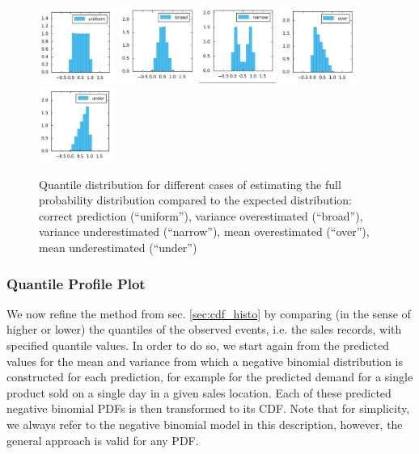 \documentclass[BCOR=1mm, DIV=calc,10pt,
twoside=true,
twocolumn,
headings=normal]{scrartcl}
\begin{document}
\begin{figure}
\begin{center}
\includegraphics[width=2.5cm]{../figures/CDFHistos_uniform}
\includegraphics[width=2.5cm]{../figures/CDFHistos_broad}
\includegraphics[width=2.5cm]{../figures/CDFHistos_narrow}
\includegraphics[width=2.5cm]{../figures/CDFHistos_over}
\includegraphics[width=2.5cm]{../figures/CDFHistos_under}
\caption{\label{fig:cdf_histos} Quantile distribution for different cases of estimating the full probability distribution compared to the expected distribution:
correct prediction (``uniform''), variance overestimated (``broad''), variance underestimated (``narrow''), mean overestimated (``over''), mean underestimated (``under'')}
\end{center}
\end{figure}

\subsubsection{Quantile Profile Plot}

We now refine the method from sec. \ref{sec:cdf_histo} by comparing (in the sense of higher or lower) the quantiles of the observed events, i.e. the sales records, with specified quantile values. In order to do so, we start again from the predicted values for the mean and variance from which a negative binomial distribution is constructed for each prediction, for example for the predicted demand for a single product sold on a single day in a given sales location. Each of these predicted negative binomial PDFs is then transformed to its CDF. Note that for simplicity, we always refer to the negative binomial model in this description, however, the general approach is valid for any PDF.
\end{document}

